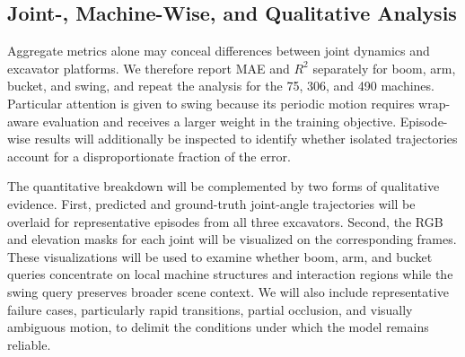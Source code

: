 \documentclass[journal]{IEEEtran}
\begin{document}
\begin{table}[!t]
\caption{Ablation Study of ST-JMCT. Values are angular MAE in radians; lower is
better.}
\label{tab:ablation_results}
\centering
{}
\end{table}

\subsection{Joint-, Machine-Wise, and Qualitative Analysis}
\label{subsec:detailed_analysis}

Aggregate metrics alone may conceal differences between joint dynamics and
excavator platforms. We therefore report MAE and $R^2$ separately for boom,
arm, bucket, and swing, and repeat the analysis for the 75, 306, and 490
machines. Particular attention is given to swing because its periodic motion
requires wrap-aware evaluation and receives a larger weight in the training
objective. Episode-wise results will additionally be inspected to identify
whether isolated trajectories account for a disproportionate fraction of the
error.

The quantitative breakdown will be complemented by two forms of qualitative
evidence. First, predicted and ground-truth joint-angle trajectories will be
overlaid for representative episodes from all three excavators. Second, the
RGB and elevation masks for each joint will be visualized on the corresponding
frames. These visualizations will be used to examine whether boom, arm, and
bucket queries concentrate on local machine structures and interaction regions
while the swing query preserves broader scene context. We will also include
representative failure cases, particularly rapid transitions, partial
occlusion, and visually ambiguous motion, to delimit the conditions under
which the model remains reliable.
\end{document}
